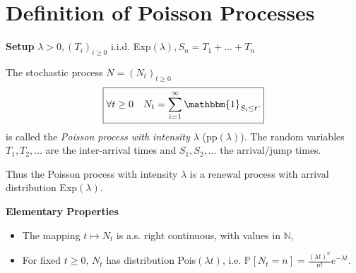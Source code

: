 \section{Definition of Poisson Processes}
\textbf{Setup}  $\lambda > 0, (T_i)_{i\geq 0}$ i.i.d. Exp$(\lambda ), S_n = T_1+ \ldots +T_n$

\begin{defn}
	The stochastic process $N=(N_t)_{t\geq 0}$
	\begin{align}
		\boxed{\forall t\geq 0 \quad N_t = \sum_{i=1}^{\infty} \mathbbm{1}_{S_i \leq t}.}
	\end{align}
	is called the \emph{Poisson process with intensity $\lambda$} (pp$(\lambda)$). The random variables $T_1,T_2, \ldots $ are the inter-arrival times and  $S_1,S_2, \ldots $ the arrival/jump times.
\end{defn}
{\color{blue}
\begin{rmk}[]
	Thus the Poisson process with intensity $\lambda $ is a renewal process with arrival distribution Exp$(\lambda)$.
\end{rmk}}

\noindent
\textbf{Elementary Properties}
\begin{itemize}
	\item The mapping $t \mapsto N_t$ is a.s. right continuous, with values in $\mathbb{N}$,
	\item For fixed $t\geq 0$, $N_t$ has distribution Pois$(\lambda t)$, i.e. $\mathbb{P}_{} \left[ N_t = n \right] = \frac{(\lambda t)^n}{n!}e^{- \lambda  t}$.
\end{itemize}

